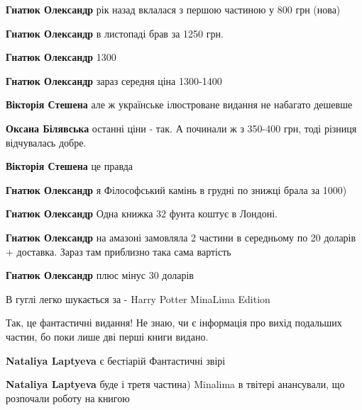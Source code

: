 \begin{itemize} %
\textbf{Гнатюк Олександр} рік назад вклалася з першою частиною у 800 грн (нова)

\textbf{Гнатюк Олександр} в листопаді брав за 1250 грн.

\textbf{Гнатюк Олександр} 1300

\textbf{Гнатюк Олександр} зараз середня ціна 1300-1400

\begin{itemize} %
\textbf{Вікторія Стешена} але ж українське ілюстроване видання не набагато дешевше

\textbf{Оксана Білявська} останні ціни - так. А починали ж з 350-400 грн, тоді різниця відчувалась добре.

\textbf{Вікторія Стешена} це правда
\end{itemize} %


\textbf{Гнатюк Олександр} я Філософський камінь в грудні по знижці брала за 1000)

\textbf{Гнатюк Олександр} Одна книжка 32 фунта коштує в Лондоні.

\textbf{Гнатюк Олександр} на амазоні замовляла 2 частини в середньому по 20 доларів + доставка. Зараз там приблизно така сама вартість

\textbf{Гнатюк Олександр} плюс мінус 30 доларів
\end{itemize} %


В гуглі легко шукається за - Harry Potter MinaLima Edition


Так, це фантастичні видання! Не знаю, чи є інформація про вихід подальших
частин, бо поки лише дві перші книги видано.

\begin{itemize} %
\textbf{Nataliya Laptyeva} є бестіарій Фантастичні звірі

\textbf{Nataliya Laptyeva} буде і третя частина) Minalima в твітері анансували, що розпочали роботу на книгою
\end{itemize} %


